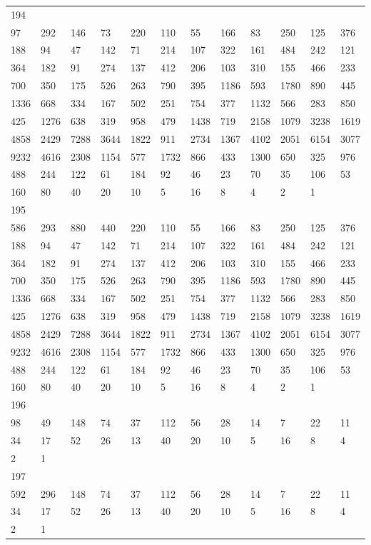 \begin{longtable}{llllllllllll}
194&&&&&&&&&&&\\
97& 292& 146& 73& 220& 110& 55& 166& 83& 250& 125& 376\\
188& 94& 47& 142& 71& 214& 107& 322& 161& 484& 242& 121\\
364& 182& 91& 274& 137& 412& 206& 103& 310& 155& 466& 233\\
700& 350& 175& 526& 263& 790& 395& 1186& 593& 1780& 890& 445\\
1336& 668& 334& 167& 502& 251& 754& 377& 1132& 566& 283& 850\\
425& 1276& 638& 319& 958& 479& 1438& 719& 2158& 1079& 3238& 1619\\
4858& 2429& 7288& 3644& 1822& 911& 2734& 1367& 4102& 2051& 6154& 3077\\
9232& 4616& 2308& 1154& 577& 1732& 866& 433& 1300& 650& 325& 976\\
488& 244& 122& 61& 184& 92& 46& 23& 70& 35& 106& 53\\
160& 80& 40& 20& 10& 5& 16& 8& 4& 2& 1& \\

195&&&&&&&&&&&\\
586& 293& 880& 440& 220& 110& 55& 166& 83& 250& 125& 376\\
188& 94& 47& 142& 71& 214& 107& 322& 161& 484& 242& 121\\
364& 182& 91& 274& 137& 412& 206& 103& 310& 155& 466& 233\\
700& 350& 175& 526& 263& 790& 395& 1186& 593& 1780& 890& 445\\
1336& 668& 334& 167& 502& 251& 754& 377& 1132& 566& 283& 850\\
425& 1276& 638& 319& 958& 479& 1438& 719& 2158& 1079& 3238& 1619\\
4858& 2429& 7288& 3644& 1822& 911& 2734& 1367& 4102& 2051& 6154& 3077\\
9232& 4616& 2308& 1154& 577& 1732& 866& 433& 1300& 650& 325& 976\\
488& 244& 122& 61& 184& 92& 46& 23& 70& 35& 106& 53\\
160& 80& 40& 20& 10& 5& 16& 8& 4& 2& 1& \\

196&&&&&&&&&&&\\
98& 49& 148& 74& 37& 112& 56& 28& 14& 7& 22& 11\\
34& 17& 52& 26& 13& 40& 20& 10& 5& 16& 8& 4\\
2& 1& \\

197&&&&&&&&&&&\\
592& 296& 148& 74& 37& 112& 56& 28& 14& 7& 22& 11\\
34& 17& 52& 26& 13& 40& 20& 10& 5& 16& 8& 4\\
2& 1& \\


\end{longtable}
